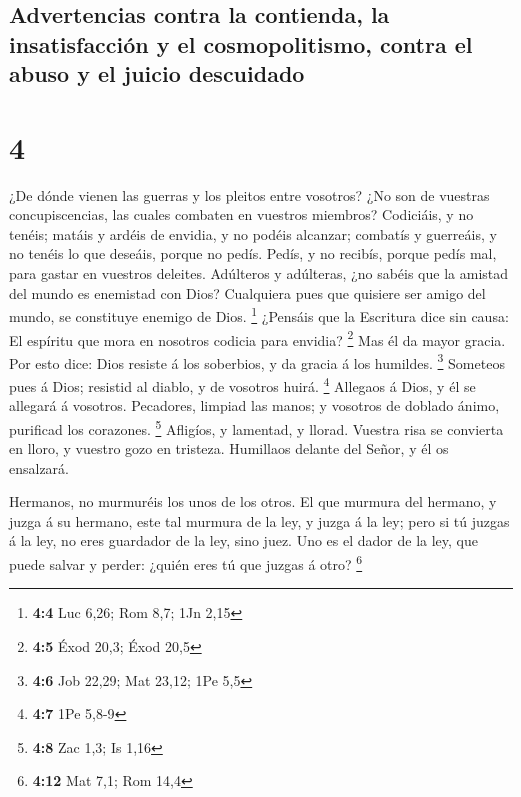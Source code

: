 \hypertarget{advertencias-contra-la-contienda-la-insatisfacciuxf3n-y-el-cosmopolitismo-contra-el-abuso-y-el-juicio-descuidado}{%
\subsection{Advertencias contra la contienda, la insatisfacción y el
cosmopolitismo, contra el abuso y el juicio
descuidado}\label{advertencias-contra-la-contienda-la-insatisfacciuxf3n-y-el-cosmopolitismo-contra-el-abuso-y-el-juicio-descuidado}}

\hypertarget{section-3}{%
\section{4}\label{section-3}}

 ¿De dónde vienen las guerras y los pleitos entre vosotros?
¿No son de vuestras concupiscencias, las cuales combaten en vuestros
miembros?  Codiciáis, y no tenéis; matáis y ardéis de
envidia, y no podéis alcanzar; combatís y guerreáis, y no tenéis lo que
deseáis, porque no pedís.  Pedís, y no recibís, porque pedís
mal, para gastar en vuestros deleites.  Adúlteros y
adúlteras, ¿no sabéis que la amistad del mundo es enemistad con Dios?
Cualquiera pues que quisiere ser amigo del mundo, se constituye enemigo
de Dios. \footnote{\textbf{4:4} Luc 6,26; Rom 8,7; 1Jn 2,15}
 ¿Pensáis que la Escritura dice sin causa: El espíritu que
mora en nosotros codicia para envidia? \footnote{\textbf{4:5} Éxod 20,3;
  Éxod 20,5}  Mas él da mayor gracia. Por esto dice: Dios
resiste á los soberbios, y da gracia á los humildes. \footnote{\textbf{4:6}
  Job 22,29; Mat 23,12; 1Pe 5,5}  Someteos pues á Dios;
resistid al diablo, y de vosotros huirá. \footnote{\textbf{4:7} 1Pe
  5,8-9}  Allegaos á Dios, y él se allegará á vosotros.
Pecadores, limpiad las manos; y vosotros de doblado ánimo, purificad los
corazones. \footnote{\textbf{4:8} Zac 1,3; Is 1,16} 
Afligíos, y lamentad, y llorad. Vuestra risa se convierta en lloro, y
vuestro gozo en tristeza.  Humillaos delante del Señor, y
él os ensalzará.

 Hermanos, no murmuréis los unos de los otros. El que
murmura del hermano, y juzga á su hermano, este tal murmura de la ley, y
juzga á la ley; pero si tú juzgas á la ley, no eres guardador de la ley,
sino juez.  Uno es el dador de la ley, que puede salvar y
perder: ¿quién eres tú que juzgas á otro? \footnote{\textbf{4:12} Mat
  7,1; Rom 14,4}

